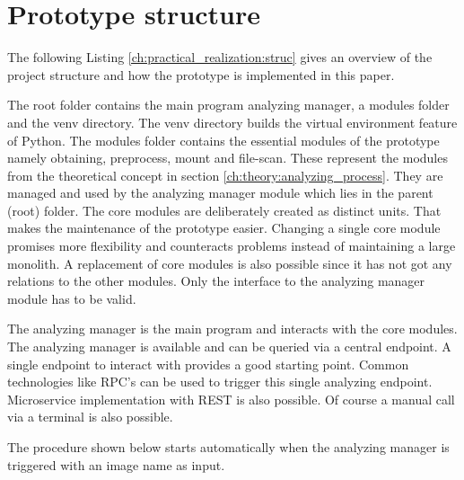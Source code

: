 \section{Prototype structure}
\label{ch:practical_realization:prot_struct}
The following Listing \ref{ch:practical_realization:struc} gives an overview of the project structure and how the prototype is implemented in this paper.

The root folder contains the main program analyzing manager, a modules folder and the venv directory.
The venv directory builds the virtual environment feature of Python. 
The modules folder contains the essential modules of the prototype namely obtaining, preprocess, mount and file-scan.
These represent the modules from the theoretical concept in section \ref{ch:theory:analyzing_process}.
They are managed and used by the analyzing manager module which lies in the parent (root) folder. 
The core modules are deliberately created as distinct units. 
That makes the maintenance of the prototype easier. 
Changing a single core module promises more flexibility and counteracts problems instead of maintaining a large monolith. 
A replacement of core modules is also possible since it has not got any relations to the other modules. 
Only the interface to the analyzing manager module has to be valid.

The analyzing manager is the main program and interacts with the core modules. 
The analyzing manager is available and can be queried via a central endpoint.
A single endpoint to interact with provides a good starting point. 
Common technologies like RPC's can be used to trigger this single analyzing endpoint. 
Microservice implementation with REST is also possible.
Of course a manual call via a terminal is also possible.

The procedure shown below starts automatically when the analyzing manager is triggered with an image name as input.

